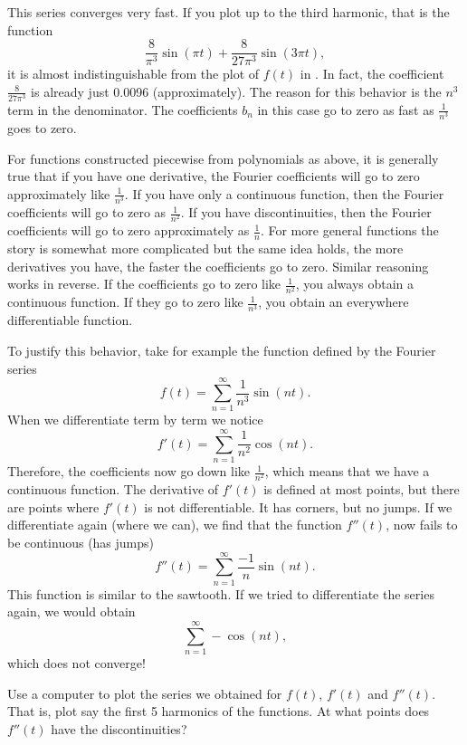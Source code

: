 \documentclass{ximera}
\begin{document}
\begin{example}
    This series converges very fast. If you plot up to the third harmonic, that is the function
    \begin{equation*}
        \frac{8}{\pi^3} \sin (\pi t) + \frac{8}{27 \pi^3} \sin (3 \pi t) ,
    \end{equation*}
    it is almost indistinguishable from the plot of $f(t)$ in . In fact, the coefficient  $\frac{8}{27 \pi^3}$ is already just 0.0096 (approximately). The reason for this behavior is the $n^3$ term in the denominator. The coefficients $b_n$ in this case go to zero as fast as $\frac{1}{n^3}$ goes to zero.
\end{example}

For functions constructed piecewise from polynomials as above, it is generally true that if you have one derivative, the Fourier coefficients will go to zero approximately like $\frac{1}{n^3}$.  If you have only a continuous function, then the Fourier coefficients will go to zero as $\frac{1}{n^2}$.  If you have discontinuities, then the Fourier coefficients will go to zero approximately as $\frac{1}{n}$. For more general functions the story is somewhat more complicated but the same idea holds, the more derivatives you have, the faster the coefficients go to zero.  Similar reasoning works in reverse.  If the coefficients go to zero like $\frac{1}{n^2}$, you always obtain a continuous function.  If they go to zero like $\frac{1}{n^3}$, you obtain an everywhere differentiable function.

To justify this behavior, take for example the function defined by the Fourier series
\begin{equation*}
    f(t) = \sum_{n=1}^\infty \frac{1}{n^3} \sin (n t) .
\end{equation*}
When we differentiate term by term we notice
\begin{equation*}
    f'(t) = \sum_{n=1}^\infty \frac{1}{n^2} \cos (n t) .
\end{equation*}
Therefore, the coefficients now go down like $\frac{1}{n^2}$, which  means that we have a continuous function. The derivative of $f'(t)$ is defined at most points, but there are points where $f'(t)$ is not differentiable. It has corners, but no jumps. If we differentiate again (where we can), we find that the function $f''(t)$, now fails to be continuous (has jumps)
\begin{equation*}
    f''(t) = \sum_{n=1}^\infty \frac{-1}{n} \sin (n t) .
\end{equation*}
This function is similar to the sawtooth.  If we tried to differentiate the series again, we would obtain
\begin{equation*}
    \sum_{n=1}^\infty -\cos (n t) ,
\end{equation*}
which does not converge!

\begin{exercise}
    Use a computer to plot the series we obtained for $f(t)$, $f'(t)$ and $f''(t)$.  That is, plot say the first 5 harmonics of the functions.  At what points does $f''(t)$ have the discontinuities?
\end{exercise}
\end{document}
